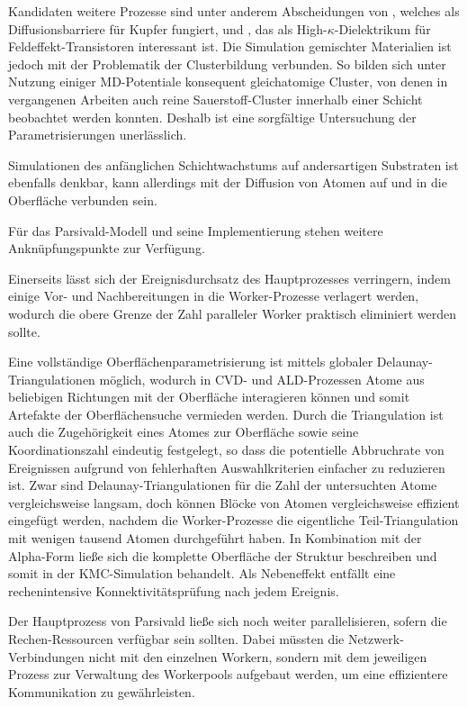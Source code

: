 Kandidaten weitere Prozesse sind unter anderem Abscheidungen von , welches als Diffusionsbarriere für Kupfer fungiert, und , das als High-$\kappa$-Dielektrikum für Feldeffekt-Transistoren interessant ist.
Die Simulation gemischter Materialien ist jedoch mit der Problematik der Clusterbildung verbunden.
So bilden sich unter Nutzung einiger MD-Potentiale konsequent gleichatomige Cluster, von denen in vergangenen Arbeiten auch reine Sauerstoff-Cluster innerhalb einer Schicht beobachtet werden konnten\cite{lorenz_entwicklung_2012}.
Deshalb ist eine sorgfältige Untersuchung der Parametrisierungen unerlässlich.

Simulationen des anfänglichen Schichtwachstums auf andersartigen Substraten ist ebenfalls denkbar, kann allerdings mit der Diffusion von Atomen auf und in die Oberfläche verbunden sein.


Für das Parsivald-Modell und seine Implementierung stehen weitere Anknüpfungspunkte zur Verfügung.

Einerseits lässt sich der Ereignisdurchsatz des Hauptprozesses verringern, indem einige Vor- und Nachbereitungen in die Worker-Prozesse verlagert werden, wodurch die obere Grenze der Zahl paralleler Worker praktisch eliminiert werden sollte.

Eine vollständige Oberflächenparametrisierung ist mittels globaler Delaunay-Triangulationen möglich, wodurch in CVD- und ALD-Prozessen Atome aus beliebigen Richtungen mit der Oberfläche interagieren können und somit Artefakte der Oberflächensuche vermieden werden.
Durch die Triangulation ist auch die Zugehörigkeit eines Atomes zur Oberfläche sowie seine Koordinationszahl eindeutig festgelegt, so dass die potentielle Abbruchrate von Ereignissen aufgrund von fehlerhaften Auswahlkriterien einfacher zu reduzieren ist.
Zwar sind Delaunay-Triangulationen für die Zahl der untersuchten Atome vergleichsweise langsam, doch können Blöcke von Atomen vergleichsweise effizient eingefügt werden, nachdem die Worker-Prozesse die eigentliche Teil-Triangulation mit wenigen tausend Atomen durchgeführt haben.
In Kombination mit der Alpha-Form ließe sich die komplette Oberfläche der Struktur beschreiben und somit in der KMC-Simulation behandelt.
Als Nebeneffekt entfällt eine rechenintensive Konnektivitätsprüfung nach jedem Ereignis.

Der Hauptprozess von Parsivald ließe sich noch weiter parallelisieren, sofern die Rechen-Ressourcen verfügbar sein sollten.
Dabei müssten die Netzwerk-Verbindungen nicht mit den einzelnen Workern, sondern mit dem jeweiligen Prozess zur Verwaltung des Workerpools aufgebaut werden, um eine effizientere Kommunikation zu gewährleisten.

